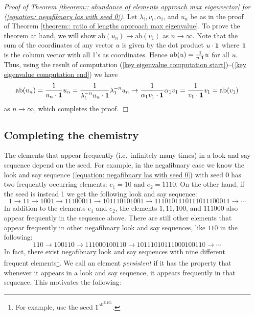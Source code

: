 \documentclass[reqno]{amsart}
\theoremstyle{definition}
\newcommand{\ab}{\text{ab}}
\begin{document}
\bigskip

\noindent\emph{Proof of Theorem \ref{theorem:: abundance of elements approach max eigenvector} for (\ref{equation: negafibnary las with seed 0}).} Let $\lambda_i, v_i, \alpha_i$, and $u_n$ be as in the proof of Theorem \ref{theorem:: ratio of lengths approach max eigenvalue}. To prove the theorem at hand, we will show $\ab(u_n)\to\ab(v_1)$ as $n\to\infty$. Note that the sum of the coordinates of any vector $u$ is given by the dot product $u\cdot{\bf 1}$ where ${\bf 1}$ is the column vector with all 1's as coordinates. Hence $\ab(u)=\frac{1}{u\cdot{\bf 1}}u$ for all $u$. Thus, using the result of computation (\ref{key eigenvalue computation start})--(\ref{key eigenvalue computation end}) we have 
\begin{equation*}
\ab(u_n)=\frac{1}{u_n\cdot{\bf 1}}u_n=\frac{1}{\lambda_1^{-n}u_n\cdot{\bf 1}}\lambda_1^{-n}u_n\to\frac{1}{\alpha_1 v_1\cdot{\bf 1}}\alpha_1 v_1=\frac{1}{v_1\cdot{\bf 1}} v_1=\ab(v_1)
\end{equation*}
as $n\to\infty$, which completes the proof. \hfill$\Box$


\subsection{Completing the chemistry} 
The elements that appear frequently (i.e.~infinitely many times) in a look and say sequence depend on the seed. For example, in the negafibnary case we know the look and say sequence (\ref{equation: negafibnary las with seed 0}) with seed 0 has two frequently occurring elements: $e_1=10$ and $e_2=1110$. On the other hand, if the seed is instead 1 we get the following look and say sequence:
\begin{equation*}\label{negafibnary las with seed 1}
1 \to 11 \to 1001 \to 11100011 \to 101110101001 \to 1110101110111011100011 \to \cdots
\end{equation*}
In addition to the elements $e_1$ and $e_2$, the elements $1, 11, 100$, and $111000$ also appear frequently in the sequence above. There are still other elements that appear frequently in other negafibnary look and say sequences, like $110$ in the following:
\begin{equation}\label{negafibnary las with seed 110}
110 \to 100110 \to 111000100110 \to 10111010111000100110 \to\cdots
\end{equation}
In fact, there exist negafibnary look and say sequences with nine different frequent elements\footnote{For example, use the seed $1^50^51101$.}. We call an element \emph{persistent} if it has the property that whenever it appears in a look and say sequence, it appears frequently in that sequence. This motivates the following:
\end{document}
